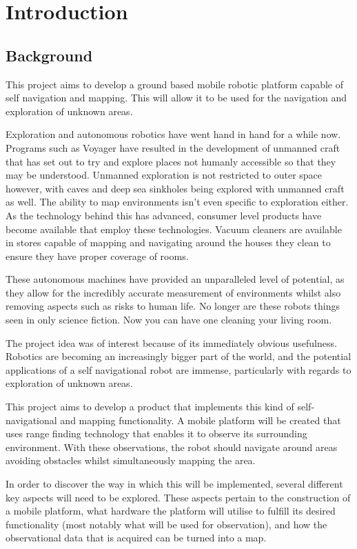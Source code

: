 \chapter{Introduction}\label{introduction}
	\section{Background}
	This project aims to develop a ground based mobile robotic platform capable of self navigation and mapping. This will allow it to be used for the navigation and exploration of unknown areas.
	
	Exploration and autonomous robotics have went hand in hand for a while now. Programs such as Voyager have resulted in the development of unmanned craft that has set out to try and explore places not humanly accessible so that they may be understood. Unmanned exploration is not restricted to outer space however, with caves\citep{mcfarlane2013integrated} and deep sea sinkholes\citep{carnegie2007sinkhole} being explored with unmanned craft as well. The ability to map environments isn't even specific to exploration either. As the technology behind this has advanced, consumer level products have become available that employ these technologies. Vacuum cleaners are available in stores capable of mapping and navigating around the houses they clean to ensure they have proper coverage of rooms.
	
	These autonomous machines have provided an unparalleled level of potential, as they allow for the incredibly accurate measurement of environments whilst also removing aspects such as risks to human life. No longer are these robots things seen in only science fiction. Now you can have one cleaning your living room.
	
	The project idea was of interest because of its immediately obvious usefulness. Robotics are becoming an increasingly bigger part of the world, and the potential applications of a self navigational robot are immense, particularly with regards to exploration of unknown areas. 
	
	This project aims to develop a product that implements this kind of self-navigational and mapping functionality. A mobile platform will be created that uses range finding technology that enables it to observe its surrounding environment. With these observations, the robot should navigate around areas avoiding obstacles whilst simultaneously mapping the area.
	
	In order to discover the way in which this will be implemented, several different key aspects will need to be explored. These aspects pertain to the construction of a mobile platform, what hardware the platform will utilise to fulfill its desired functionality (most notably what will be used for observation), and how the observational data that is acquired can be turned into a map.

